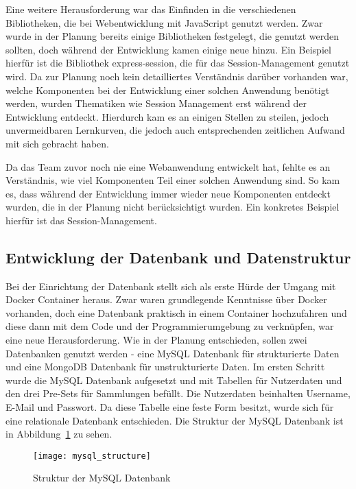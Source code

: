 Eine weitere Herausforderung war das Einfinden in die verschiedenen Bibliotheken, die bei Webentwicklung mit JavaScript genutzt werden.
Zwar wurde in der Planung bereits einige Bibliotheken festgelegt, die genutzt werden sollten, doch während der Entwicklung kamen einige neue hinzu.
Ein Beispiel hierfür ist die Bibliothek express-session, die für das Session-Management genutzt wird.
Da zur Planung noch kein detailliertes Verständnis darüber vorhanden war, welche Komponenten bei der Entwicklung einer solchen Anwendung benötigt werden, wurden Thematiken wie Session Management erst während der Entwicklung entdeckt.
Hierdurch kam es an einigen Stellen zu steilen, jedoch unvermeidbaren Lernkurven, die jedoch auch entsprechenden zeitlichen Aufwand mit sich gebracht haben.

Da das Team zuvor noch nie eine Webanwendung entwickelt hat, fehlte es an Verständnis, wie viel Komponenten Teil einer solchen Anwendung sind.
So kam es, dass während der Entwicklung immer wieder neue Komponenten entdeckt wurden, die in der Planung nicht berücksichtigt wurden.
Ein konkretes Beispiel hierfür ist das Session-Management.

\subsection{Entwicklung der Datenbank und Datenstruktur}\label{subsec:entwicklung-der-datenbank-und-datenstruktur}

Bei der Einrichtung der Datenbank stellt sich als erste Hürde der Umgang mit Docker Container heraus.
Zwar waren grundlegende Kenntnisse über Docker vorhanden, doch eine Datenbank praktisch in einem Container hochzufahren und diese dann mit dem Code und der Programmierumgebung zu verknüpfen, war eine neue Herausforderung.
Wie in der Planung entschieden, sollen zwei Datenbanken genutzt werden - eine MySQL Datenbank für strukturierte Daten und eine MongoDB Datenbank für unstrukturierte Daten.
Im ersten Schritt wurde die MySQL Datenbank aufgesetzt und mit Tabellen für Nutzerdaten und den drei Pre-Sets für Sammlungen befüllt.
Die Nutzerdaten beinhalten Username, E-Mail und Passwort.
Da diese Tabelle eine feste Form besitzt, wurde sich für eine relationale Datenbank entschieden.
Die Struktur der MySQL Datenbank ist in Abbildung~\ref{fig:mysql_structure} zu sehen.
\newpage
\begin{figure}[h]
    \centering
    \texttt{[image: mysql\_structure]}
    \caption{Struktur der MySQL Datenbank}
    \label{fig:mysql_structure}
\end{figure}

